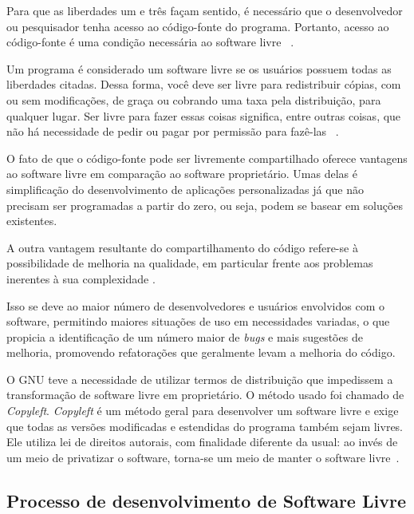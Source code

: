 Para que as liberdades um e três façam sentido, é necessário que o desenvolvedor ou pesquisador tenha acesso ao código-fonte do programa.  Portanto, acesso ao código-fonte é uma condição necessária ao software livre ~\cite{gnu2013}.

Um programa é considerado um software livre se os usuários possuem todas as liberdades citadas. Dessa forma, você deve ser livre para redistribuir cópias, com ou sem modificações, de graça ou cobrando uma taxa pela distribuição, para qualquer lugar. Ser livre para fazer essas coisas significa, entre outras coisas, que não há necessidade de pedir ou pagar por permissão para fazê-las ~\cite{anaPaula2012}.

O fato de que o código-fonte pode ser livremente compartilhado oferece vantagens ao software livre em comparação ao software proprietário. Umas delas é simplificação do desenvolvimento de aplicações personalizadas já que não precisam ser programadas a partir do zero, ou seja, podem se basear em soluções existentes.

A outra vantagem resultante do compartilhamento do código refere-se à possibilidade de melhoria na qualidade, em particular frente aos problemas inerentes à sua complexidade \cite{catedralBazzar}.

Isso se deve ao maior número de desenvolvedores e usuários envolvidos com o software, permitindo maiores situações de uso em necessidades variadas, o que propicia a identificação de um número maior de \emph{bugs} e mais sugestões de melhoria, promovendo refatorações que geralmente levam a melhoria do código.

O GNU teve a necessidade de utilizar termos de distribuição que impedissem a transformação de software livre em proprietário. O método usado foi chamado de \emph{Copyleft}. \emph{Copyleft} é um método geral para desenvolver um software livre e exige que todas as versões modificadas e estendidas do programa também sejam livres. Ele utiliza lei de direitos autorais, com finalidade diferente da usual: ao invés de um meio de privatizar o software, torna-se um meio de manter o software livre~\cite{stallman2009}.

\subsection{Processo de desenvolvimento de Software Livre}
\label{des-soft-livre}

